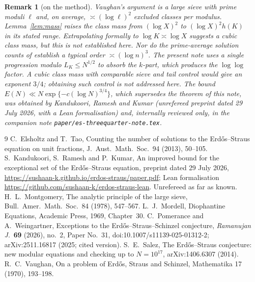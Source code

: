 \documentclass[11pt,reqno]{amsart}
\newtheorem{remark}[theorem]{Remark}
\begin{document}
\begin{remark}[on the method]
Vaughan's argument is a large sieve with prime moduli $\ell$ and, on average,
$\asymp(\log\ell)^2$ excluded classes per modulus.  Lemma~\ref{lem:mass}
raises the class mass from $(\log X)^2$ to $(\log X)^2h(K)$ in its stated
range.  Extrapolating formally to $\log K\asymp\log X$ suggests a cubic
class mass, but this is not established here.  Nor do the prime-average
solution counts of \cite{ET} establish a typical order $\asymp(\log n)^3$.
The present note uses a single progression modulo $L_K\le N^{1/2}$ to
absorb the $k$-part, which produces the $\log\log$ factor.  A cubic class
mass with comparable sieve and tail control would give an exponent $3/4$;
obtaining such control is not addressed here.  The bound
$E(N)\ll N\exp\{-c(\log N)^{3/4}\}$, which supersedes the theorem of this
note, was obtained by Kandukoori, Ramesh and Kumar \cite{KRK} (unrefereed
preprint dated 29 July 2026, with a Lean formalisation) and, internally
reviewed only, in the companion note
\texttt{paper/es-threequarter-note.tex}.
\end{remark}

\begin{thebibliography}{9}
 C.~Elsholtz and T.~Tao, Counting the number of solutions to the
Erd\H{o}s--Straus equation on unit fractions, J.\ Aust.\ Math.\ Soc.\ 94 (2013),
50--105.
 S.~Kandukoori, S.~Ramesh and P.~Kumar, An improved bound for the
exceptional set of the Erd\H{o}s--Straus equation, preprint dated 29 July 2026,
\url{https://sushaan-k.github.io/erdos-straus/paper.pdf}; Lean formalisation
\url{https://github.com/sushaan-k/erdos-straus-lean}.  Unrefereed as far as known.
 H.~L.~Montgomery, The analytic principle of the large
sieve, Bull.\ Amer.\ Math.\ Soc.\ 84 (1978), 547--567.
 L.~J.~Mordell, Diophantine Equations, Academic Press, 1969,
Chapter~30.
 C.~Pomerance and A.~Weingartner, Exceptions to the
Erd\H{o}s--Straus--Schinzel conjecture, \emph{Ramanujan J.}\ \textbf{69} (2026), no.~2, Paper No.~31,
doi:10.1007/s11139-025-01312-2; arXiv:2511.16817 (2025;
cited version).
 S.~E.~Salez, The Erd\H{o}s--Straus conjecture: new modular
equations and checking up to $N=10^{17}$, arXiv:1406.6307 (2014).
 R.~C.~Vaughan, On a problem of Erd\H{o}s, Straus and
Schinzel, Mathematika 17 (1970), 193--198.
\end{thebibliography}
\end{document}
